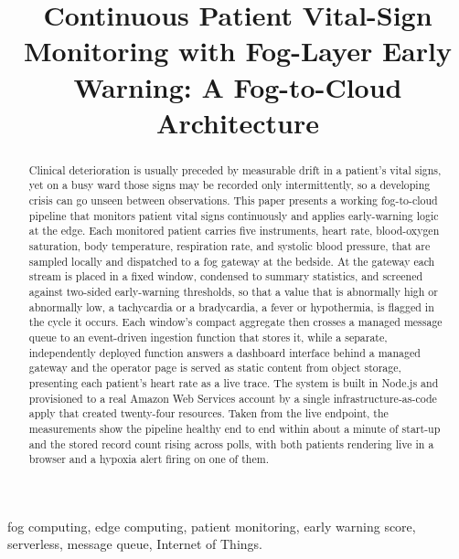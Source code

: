 \documentclass[conference]{IEEEtran}
\begin{document}
\title{Continuous Patient Vital-Sign Monitoring with Fog-Layer Early Warning: A Fog-to-Cloud Architecture}

\author{
}

\maketitle

\begin{abstract}
Clinical deterioration is usually preceded by measurable drift in a patient's vital signs, yet on a busy ward those signs may be recorded only intermittently, so a developing crisis can go unseen between observations. This paper presents a working fog-to-cloud pipeline that monitors patient vital signs continuously and applies early-warning logic at the edge. Each monitored patient carries five instruments, heart rate, blood-oxygen saturation, body temperature, respiration rate, and systolic blood pressure, that are sampled locally and dispatched to a fog gateway at the bedside. At the gateway each stream is placed in a fixed window, condensed to summary statistics, and screened against two-sided early-warning thresholds, so that a value that is abnormally high or abnormally low, a tachycardia or a bradycardia, a fever or hypothermia, is flagged in the cycle it occurs. Each window's compact aggregate then crosses a managed message queue to an event-driven ingestion function that stores it, while a separate, independently deployed function answers a dashboard interface behind a managed gateway and the operator page is served as static content from object storage, presenting each patient's heart rate as a live trace. The system is built in Node.js and provisioned to a real Amazon Web Services account by a single infrastructure-as-code apply that created twenty-four resources. Taken from the live endpoint, the measurements show the pipeline healthy end to end within about a minute of start-up and the stored record count rising across polls, with both patients rendering live in a browser and a hypoxia alert firing on one of them.
\end{abstract}

\begin{IEEEkeywords}
fog computing, edge computing, patient monitoring, early warning score, serverless, message queue, Internet of Things.
\end{IEEEkeywords}
\end{document}
